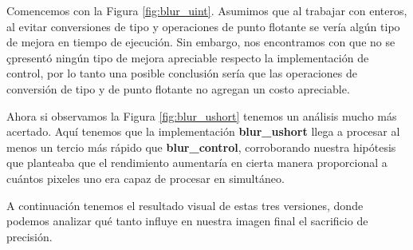 Comencemos con la Figura \ref{fig:blur_uint}. Asumimos que al trabajar con enteros, al
evitar conversiones de tipo y operaciones de punto flotante se vería algún tipo
de mejora en tiempo de ejecución. Sin embargo, nos encontramos con que no se
çpresentó ningún tipo de mejora apreciable respecto la implementación de control,
por lo tanto una posible conclusión sería que las operaciones de conversión de
tipo y de punto flotante no agregan un costo apreciable.

Ahora si observamos la Figura \ref{fig:blur_ushort} tenemos un análisis mucho
más acertado. Aquí tenemos que la implementación \textbf{blur\_ushort} llega a
procesar al menos un tercio más rápido que \textbf{blur\_control}, corroborando
nuestra hipótesis que planteaba que el rendimiento aumentaría en cierta manera
proporcional a cuántos pixeles uno era capaz de procesar en simultáneo.

A continuación tenemos el resultado visual de estas tres versiones, donde
podemos analizar qué tanto influye en nuestra imagen final el sacrificio de
precisión.


